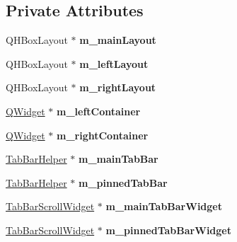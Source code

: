 \subsection*{Private Attributes}
\begin{DoxyCompactItemize}
\item 
\hypertarget{class_combo_tab_bar_acaa83471248b7e20390a8d0e8b9dc27e}{
QHBoxLayout $\ast$ {\bfseries m\_\-mainLayout}}
\label{class_combo_tab_bar_acaa83471248b7e20390a8d0e8b9dc27e}

\item 
\hypertarget{class_combo_tab_bar_afdcf007a49d034baffb3a5794a236381}{
QHBoxLayout $\ast$ {\bfseries m\_\-leftLayout}}
\label{class_combo_tab_bar_afdcf007a49d034baffb3a5794a236381}

\item 
\hypertarget{class_combo_tab_bar_a558bc651311777d9a3ad392b5ddbaa94}{
QHBoxLayout $\ast$ {\bfseries m\_\-rightLayout}}
\label{class_combo_tab_bar_a558bc651311777d9a3ad392b5ddbaa94}

\item 
\hypertarget{class_combo_tab_bar_a6cc9c2a3a16201cd0984f5bd41258042}{
\hyperlink{class_q_widget}{QWidget} $\ast$ {\bfseries m\_\-leftContainer}}
\label{class_combo_tab_bar_a6cc9c2a3a16201cd0984f5bd41258042}

\item 
\hypertarget{class_combo_tab_bar_a66a2efc3eed4095e7f9862656de1a332}{
\hyperlink{class_q_widget}{QWidget} $\ast$ {\bfseries m\_\-rightContainer}}
\label{class_combo_tab_bar_a66a2efc3eed4095e7f9862656de1a332}

\item 
\hypertarget{class_combo_tab_bar_a9dbfacde3077b92ba3044623463b9257}{
\hyperlink{class_tab_bar_helper}{TabBarHelper} $\ast$ {\bfseries m\_\-mainTabBar}}
\label{class_combo_tab_bar_a9dbfacde3077b92ba3044623463b9257}

\item 
\hypertarget{class_combo_tab_bar_a76d46b2305c97bbe34108f12b7a29643}{
\hyperlink{class_tab_bar_helper}{TabBarHelper} $\ast$ {\bfseries m\_\-pinnedTabBar}}
\label{class_combo_tab_bar_a76d46b2305c97bbe34108f12b7a29643}

\item 
\hypertarget{class_combo_tab_bar_a13160404b902adde21884aa1a09c2302}{
\hyperlink{class_tab_bar_scroll_widget}{TabBarScrollWidget} $\ast$ {\bfseries m\_\-mainTabBarWidget}}
\label{class_combo_tab_bar_a13160404b902adde21884aa1a09c2302}

\item 
\hypertarget{class_combo_tab_bar_a6d60e544d64cb0c4610983a3008b6e3a}{
\hyperlink{class_tab_bar_scroll_widget}{TabBarScrollWidget} $\ast$ {\bfseries m\_\-pinnedTabBarWidget}}
\label{class_combo_tab_bar_a6d60e544d64cb0c4610983a3008b6e3a}


\end{DoxyCompactItemize}
